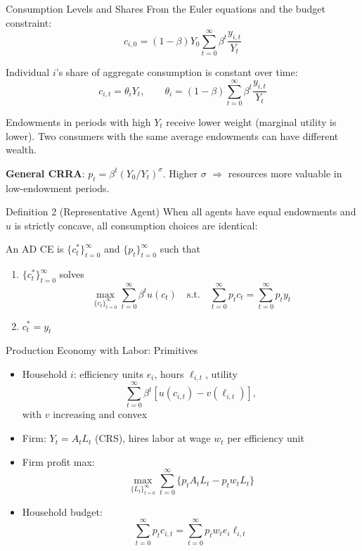 \documentclass[blue]{beamer}
\begin{document}
\begin{frame}{Consumption Levels and Shares}
	From the Euler equations and the budget constraint:
	\[
	c_{i,0} = (1-\beta) Y_0 \sum_{t=0}^{\infty} \beta^t \frac{y_{i,t}}{Y_t}
	\]
	
	Individual $i$'s share of aggregate consumption is constant over time:
	\[
	c_{i,t} = \theta_i Y_t, \qquad \theta_i = (1-\beta) \sum_{t=0}^{\infty} \beta^t \frac{y_{i,t}}{Y_t}
	\]
	
	Endowments in periods with high $Y_t$ receive lower weight (marginal utility is lower). Two consumers with the same average endowments can have different wealth.
	
	\bigskip
	\textbf{General CRRA}: $p_t = \beta^t (Y_0/Y_t)^\sigma$. Higher $\sigma$ $\Rightarrow$ resources more valuable in low-endowment periods.
\end{frame}

\begin{frame}{Definition 2 (Representative Agent)}
	When all agents have equal endowments and $u$ is strictly concave, all consumption choices are identical:
	
	\bigskip
	An AD CE is $\{c_t^*\}_{t=0}^{\infty}$ and $\{p_t\}_{t=0}^{\infty}$ such that
	
	\begin{enumerate}
		\item $\{c_t^*\}_{t=0}^{\infty}$ solves
		\[
		\max_{\{c_t\}_{t=0}^{\infty}} \sum_{t=0}^{\infty} \beta^t u(c_t) \quad \text{s.t.} \quad \sum_{t=0}^{\infty} p_t c_t = \sum_{t=0}^{\infty} p_t y_t
		\]
		
		\item $c_t^* = y_t$
	\end{enumerate}
\end{frame}

\begin{frame}{Production Economy with Labor: Primitives}
	\begin{itemize}
		\item Household $i$: efficiency units $e_i$, hours $\ell_{i,t}$, utility 
		$$
		\sum_{t=0}^{\infty} \beta^t [u(c_{i,t}) - v(\ell_{i,t})],
		$$ 
		with $v$ increasing and convex
		\item Firm: $Y_t = A_t L_t$ (CRS), hires labor at wage $w_t$ per efficiency unit
		\item Firm profit max: 
		$$
		\max_{\{L_t\}_{t=0}^{\infty}} \sum_{t=0}^{\infty} \{ p_t A_t L_t - p_t w_t L_t \}
		$$
		\item Household budget: 
		$$
		\sum_{t=0}^{\infty} p_t c_{i,t} = \sum_{t=0}^{\infty} p_t w_t e_i \ell_{i,t}
		$$
	\end{itemize}
\end{frame}
\end{document}
